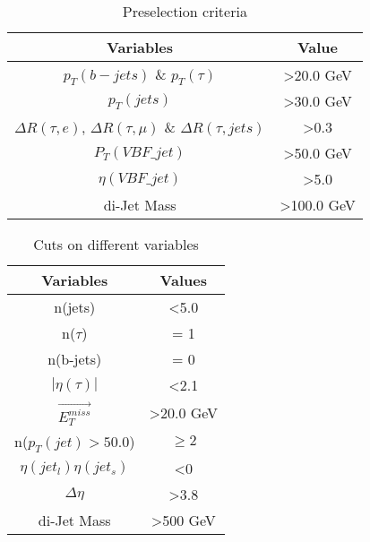 \begin{table}[h]
\centering
\caption{Preselection criteria}
\label{preselection_table}
\begin{tabular}{|c|c|}
\hline
Variables                                                                & Value                 \\ \hline
$p_T(b-jets)$ \& $p_T(\tau)$                                            & \textgreater 20.0 GeV \\ \hline
$p_T(jets)$                                                             & \textgreater 30.0 GeV  \\ \hline
$\Delta R (\tau, e)$, $\Delta R (\tau, \mu)$ \& $\Delta R (\tau, jets)$ & \textgreater 0.3      \\ \hline
$P_T(VBF\_jet)$                                                          & \textgreater 50.0 GeV \\ \hline
$\eta(VBF\_jet)$                                                         & \textgreater5.0       \\ \hline
di-Jet Mass                                                               & \textgreater100.0 GeV \\ \hline
\end{tabular}
\end{table}


\begin{table}[h]
\centering
\caption{Cuts on different variables}
\label{Cuts_variables}
\begin{tabular}{|c|c|}
\hline
Variables                & Values                \\ \hline
n(jets)                  & \textless 5.0         \\ \hline
n($\tau$)                & = 1                   \\ \hline
n(b-jets)                & = 0                   \\ \hline
$|\eta(\tau)|$           & \textless 2.1         \\ \hline
$\vec{E_T^{miss}}$       & \textgreater 20.0 GeV \\ \hline
n($p_T(jet) > 50.0$)     & $\geq 2$              \\ \hline
$\eta(jet_l)\eta(jet_s)$ & \textless0            \\ \hline
$\Delta \eta$            & \textgreater3.8       \\ \hline
di-Jet Mass                & \textgreater500 GeV    \\ \hline
\end{tabular}
\end{table}


